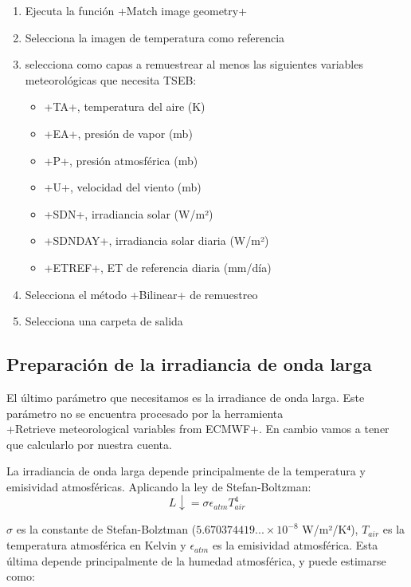 \documentclass[a4paper,11pt]{article}
\begin{document}
   \begin{enumerate}
    \item Ejecuta la función \cverb+Match image geometry+
    
    \item Selecciona la imagen de temperatura como referencia
    
    \item selecciona como capas a remuestrear al menos las siguientes variables meteorológicas que necesita TSEB:
    
    \begin{itemize} 
     \item \cverb+TA+, temperatura del aire (K)
     \item \cverb+EA+, presión de vapor (mb)
     \item \cverb+P+, presión atmosférica (mb)
     \item \cverb+U+, velocidad del viento (mb)
     \item \cverb+SDN+, irradiancia solar (W/m²)
     \item \cverb+SDNDAY+, irradiancia solar diaria (W/m²)
     \item \cverb+ETREF+, ET de referencia diaria (mm/día)
    \end{itemize}
    
    \item Selecciona el método \cverb+Bilinear+ de remuestreo
    
    \item Selecciona una carpeta de salida
   \end{enumerate}

   \subsection{Preparación de la irradiancia de onda larga}
    El último parámetro que necesitamos es la irradiance de onda larga. Este parámetro no se encuentra procesado por la herramienta\\
    \cverb+Retrieve meteorological variables from ECMWF+. En cambio vamos a tener que calcularlo por nuestra cuenta.
    
    La irradiancia de onda larga depende principalmente de la temperatura y emisividad atmosféricas. Aplicando la ley de Stefan-Boltzman:
    \begin{equation*}
     L\downarrow = \sigma \epsilon_{atm} T_{air}^4
    \end{equation*}
    
    $\sigma$ es la constante de Stefan-Bolztman ($5.670374419...\times10^{-8}$ W/m²/K⁴), $T_{air}$ es la temperatura atmosférica en Kelvin y $\epsilon_{atm}$ es la emisividad atmosférica. Esta última depende principalmente de la humedad atmosférica, y puede estimarse como:
    
\end{document}
